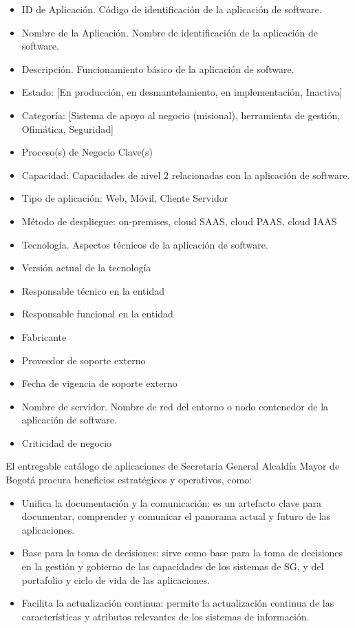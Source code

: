 \documentclass[
	a4paper, %
	12pt, %
]{include/CSSullivanBusinessReport}
\def\tightlist{}
\begin{document}
\begin{itemize}
\tightlist
\item
  ID de Aplicación. Código de identificación de la aplicación de
  software.
\item
  Nombre de la Aplicación. Nombre de identificación de la aplicación de
  software.
\item
  Descripción. Funcionamiento básico de la aplicación de software.
\item
  Estado: {[}En producción, en desmantelamiento, en implementación,
  Inactiva{]}
\item
  Categoría: {[}Sistema de apoyo al negocio (misional), herramienta de
  gestión, Ofimática, Seguridad{]}
\item
  Proceso(s) de Negocio Clave(s)
\item
  Capacidad: Capacidades de nivel 2 relacionadas con la aplicación de
  software.
\item
  Tipo de aplicación: Web, Móvil, Cliente Servidor
\item
  Método de despliegue: on-premises, cloud SAAS, cloud PAAS, cloud IAAS
\item
  Tecnología. Aspectos técnicos de la aplicación de software.
\item
  Versión actual de la tecnología
\item
  Responsable técnico en la entidad
\item
  Responsable funcional en la entidad
\item
  Fabricante
\item
  Proveedor de soporte externo
\item
  Fecha de vigencia de soporte externo
\item
  Nombre de servidor. Nombre de red del entorno o nodo contenedor de la
  aplicación de software.
\item
  Criticidad de negocio
\end{itemize}

El entregable catálogo de aplicaciones de Secretaria General Alcaldía
Mayor de Bogotá procura beneficios estratégicos y operativos, como:

\begin{itemize}
\tightlist
\item
  Unifica la documentación y la comunicación: es un artefacto clave para
  documentar, comprender y comunicar el panorama actual y futuro de las
  aplicaciones.
\item
  Base para la toma de decisiones: sirve como base para la toma de
  decisiones en la gestión y gobierno de las capacidades de los sistemas
  de SG, y del portafolio y ciclo de vida de las aplicaciones.
\item
  Facilita la actualización continua: permite la actualización continua
  de las características y atributos relevantes de los sistemas de
  información.
\end{itemize}
\end{document}
